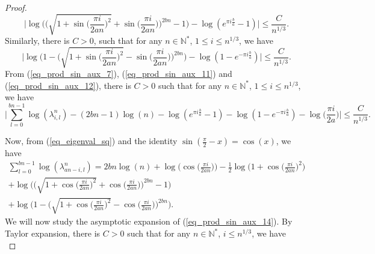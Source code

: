 \documentclass[12pt]{article}
\numberwithin{equation}{section}
\theoremstyle{theorem}
\theoremstyle{definition}
\theoremstyle{remark}
\newcommand{\nat}{\mathbb{N}}
\begin{document}
\begin{proof}
\begin{equation}
				\bigg|
				\log 
				\Big(
					\Big( \sqrt{ 1 + \sin  \big( \frac{\pi i}{2 a n} \big)^2} + \sin  \big( \frac{\pi i}{2 a n} \big) \Big)^{2bn} - 1
				\Big)
				-
				\log(e^{\pi i \frac{b}{a}} - 1)
				\bigg|
				\leq
				\frac{C}{n^{1/3}}.
			\end{equation}
			Similarly, there is $C > 0$, such that for any $n \in \nat^*$, $1 \leq i \leq  n^{1/3}$, we have
			\begin{equation}\label{eq_prod_sin_aux_12}
				\bigg|
				\log 
				\Big(
					1 - \Big(  \sqrt{ 1 + \sin  \big( \frac{\pi i}{2 a n} \big)^2} - \sin  \big( \frac{\pi i}{2 a n} \big) \Big)^{2bn}
				\Big)
				-
				\log(1 - e^{- \pi i \frac{b}{a}})
				\bigg|
				\leq
				\frac{C}{n^{1/3}}.
			\end{equation}
			From (\ref{eq_prod_sin_aux_7}), (\ref{eq_prod_sin_aux_11}) and (\ref{eq_prod_sin_aux_12}), there is $C > 0$ such that for any $n \in \nat^*$, $1 \leq i \leq  n^{1/3}$, we have
			\begin{equation}\label{eq_prod_sin_aux_13}
				\bigg|
				\sum_{l = 0}^{bn - 1} 
				\log(\lambda_{i, l}^{n})
				-
				(2bn - 1) \log(n) 
				-
				\log(e^{\pi i \frac{b}{a}} - 1)
				-
				\log(1 - e^{- \pi i \frac{b}{a}})
				-
				\log 
				\Big(
					\frac{\pi i}{2 a}
				\Big)
				\bigg|
				\leq
				\frac{C}{n^{1/3}}.
			\end{equation}
			\par Now, from (\ref{eq_eigenval_sq}) and the identity $\sin(\frac{\pi}{2} - x) = \cos(x)$, we have
			\begin{multline}\label{eq_prod_sin_aux_14}
				\sum_{l = 0}^{bn - 1} 
				\log(\lambda_{an - i, l}^{n})
				=
				2 bn \log(n) 
				+
				\log \Big(
					\cos  \big( \frac{\pi i}{2 a n} \big)
				\Big)
				-
				\frac{1}{2}
				\log \Big(
					1 + \cos  \big( \frac{\pi i}{2 a n} \big)^2
				\Big)
				\\
				+
				\log 
				\Big(
					\Big( \sqrt{ 1 + \cos  \big( \frac{\pi i}{2 a n} \big)^2} +  \cos  \big( \frac{\pi i}{2 a n} \big) \Big)^{2bn} - 1
				\Big)
				\\
				+
				\log 
				\Big(
					1 - \Big(  \sqrt{ 1 + \cos  \big( \frac{\pi i}{2 a n} \big)^2} - \cos  \big( \frac{\pi i}{2 a n} \big) \Big)^{2bn}
				\Big).
			\end{multline}
			We will now study the asymptotic expansion of (\ref{eq_prod_sin_aux_14}).
			By Taylor expansion, there is $C > 0$ such that for any $n \in \nat^*$, $i \leq n^{1/3}$, we have
			\begin{equation}\label{eq_prod_sin_aux_15}

\end{equation}
\end{proof}
\end{document}
